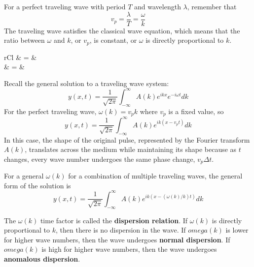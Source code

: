 \documentclass[11pt]{article}
\begin{document}
For a perfect traveling wave with period $T$ and wavelength $\lambda$, remember that
\begin{equation}
	v_p = \frac{\lambda}{T} = \frac{\omega}{k}
\end{equation}
The traveling wave satisfies the classical wave equation, which means that the ratio between $\omega$ and $k$, or $v_p$, is constant, or $\omega$ is directly proportional to $k$.
	\begin{IEEEeqnarray}{rCl}
		 & = & \alpha {}\\
		 & = & 
	\end{IEEEeqnarray}
	
	Recall the general solution to a traveling wave system:
	\begin{equation}
		y(x, t) = \frac{1}{\sqrt{2\pi}} \int_{-\infty}^\infty A(k)e^{ikx}e^{-i\omega t}dk
	\end{equation}
For the perfect traveling wave, $\omega(k) = v_p k$ where $v_p$ is a fixed value, so
	\begin{equation}
		y(x, t) = \frac{1}{\sqrt{2\pi}} \int_{-\infty}^\infty A(k)e^{ik(x-v_p t)}dk
	\end{equation}
In this case, the shape of the original pulse, represented by the Fourier transform $A(k)$, translates across the medium while maintaining its shape because as $t$ changes, every wave number undergoes the same phase change, $v_p \Delta t$.

	For a general $\omega(k)$ for a combination of multiple traveling waves, the general form of the solution is
	\begin{equation}
		y(x, t) = \frac{1}{\sqrt{2\pi}} \int_{-\infty}^\infty A(k)e^{ik(x-(\omega(k)/k) t)}dk
	\end{equation}
	
	The $\omega(k)$ time factor is called the \textbf{dispersion relation}. If $\omega(k)$ is directly proportional to $k$, then there is no dispersion in the wave. If $omega(k)$ is lower for higher wave numbers, then the wave undergoes \textbf{normal dispersion}. If $omega(k)$ is high for higher wave numbers, then the wave undergoes \textbf{anomalous dispersion}.

%		
%		


\end{document}

